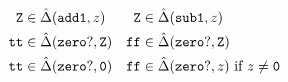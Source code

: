 \documentclass[preprint,onecolumn,9pt]{sigplanconf} %
\begin{document}
\begin{align*}
{\tt Z} &\in \hat{\Delta}({\tt add1},z) &
{\tt Z} &\in \hat{\Delta}({\tt sub1},z)\\
{\tt tt} &\in \hat{\Delta}({\tt zero?},{\tt Z}) &
{\tt ff} &\in \hat{\Delta}({\tt zero?},{\tt Z})\\
{\tt tt} &\in \hat{\Delta}({\tt zero?},{\tt 0}) &
{\tt ff} &\in \hat{\Delta}({\tt zero?},z)\text{ if }z\neq {\tt 0}\\
\end{align*}

\end{document}
